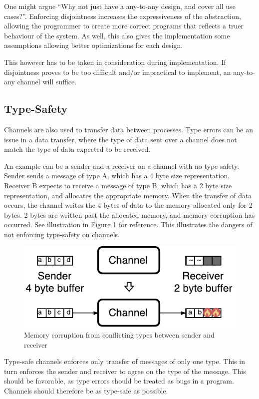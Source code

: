 One might argue ``Why not just have a any\hyp{}to\hyp{}any design, and cover all use cases?''. Enforcing disjointness increases the expressiveness of the abstraction, allowing the programmer to create more correct programs that reflects a truer behaviour of the system. As well, this also gives the implementation some assumptions allowing better optimizations for each design. 

This however has to be taken in consideration during implementation. If disjointness proves to be too difficult and/or impractical to implement, an any\hyp{}to\hyp{}any channel will suffice. 

\subsection{Type\hyp{}Safety}

Channels are also used to transfer data between processes. Type errors can be an issue in a data transfer, where the type of data sent over a channel does not match the type of data expected to be received. 

An example can be a sender and a receiver on a channel with no type\hyp{}safety. Sender sends a message of type A, which has a 4 byte size representation. Receiver B expects to receive a message of type B, which has a 2 byte size representation, and allocates the appropriate memory. When the transfer of data occurs, the channel writes the 4 bytes of data to the memory allocated only for 2 bytes. 2 bytes are written past the allocated memory, and memory corruption has occurred. See illustration in Figure \ref{fig:type_error} for reference. This illustrates the dangers of not enforcing type\hyp{}safety on channels. 

\FloatBarrier

\begin{figure}[h]
    \centering
    \includegraphics[width=0.6\linewidth]{fig/type_error}
    \caption{Memory corruption from conflicting types between sender and receiver}
    \label{fig:type_error}
\end{figure}

\FloatBarrier

Type\hyp{}safe channels enforces only transfer of messages of only one type. This in turn enforces the sender and receiver to agree on the type of the message. This should be favorable, as type errors should be treated as bugs in a program. Channels should therefore be as type\hyp{}safe as possible.

